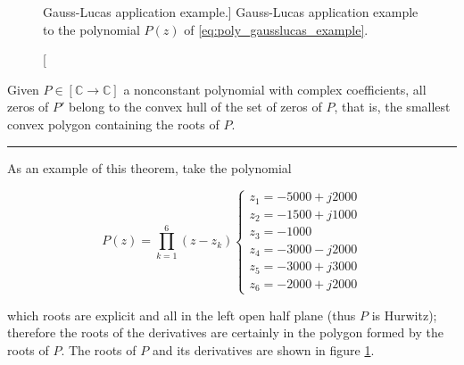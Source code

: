 \begin{figure}[t]
{
}
\caption
[Gauss-Lucas application example.]
{Gauss-Lucas application example to the polynomial $P(z)$ of \eqref{eq:poly_gausslucas_example}.}
\label{fig:gausslucas_example}
\end{figure} %

\begin{theorem}
	Given $P\in\left[\mathbb{C}\to\mathbb{C}\right]$ a nonconstant polynomial with complex coefficients, all zeros of $P'$ belong to the convex hull of the set of zeros of $P$, that is, the smallest convex polygon containing the roots of $P$.
\end{theorem}
\hrule
\vspace{3mm}

	As an example of this theorem, take the polynomial

\begin{equation} P(z) = \prod_{k=1}^6 \left(z - z_k\right)\left\{\begin{array}{l} z_1 = -5000 + j2000 \\ z_2 = -1500 + j1000 \\ z_3 = -1000 \\ z_4 = -3000 - j2000 \\ z_5 = -3000 + j3000 \\ z_6 = -2000 + j2000 \end{array}\right.  \label{eq:poly_gausslucas_example} \end{equation}

	\noindent which roots are explicit and all in the left open half plane (thus $P$ is Hurwitz); therefore the roots of the derivatives are certainly in the polygon formed by the roots of $P$. The roots of $P$ and its derivatives are shown in figure \ref{fig:gausslucas_example}.


